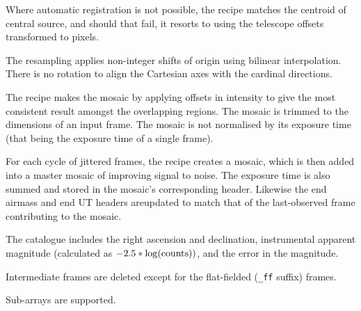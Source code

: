 \documentclass[twoside,11pt,nolof]{starlink}
\begin{document}
{{{         \sstitem
         Where automatic registration is not possible, the recipe matches
         the centroid of central source, and should that fail, it resorts
         to using the telescope offsets transformed to pixels.

         \sstitem
         The resampling applies non-integer shifts of origin using
         bilinear interpolation.  There is no rotation to align the
         Cartesian axes with the cardinal directions.

         \sstitem
         The recipe makes the mosaic by applying offsets in intensity to
         give the most consistent result amongst the overlapping regions.
         The mosaic is trimmed to the dimensions of an input frame.  The
         mosaic is not normalised by its exposure time (that being the
         exposure time of a single frame).

         \sstitem
         For each cycle of jittered frames, the recipe creates a mosaic,
         which is then added into a master mosaic of improving signal to
         noise.  The exposure time is also summed and stored in the mosaic's
         corresponding header.  Likewise the end airmass and end UT headers
         areupdated to match that of the last-observed frame contributing
         to the mosaic.

         \sstitem
         The catalogue includes the right ascension and declination,
         instrumental apparent magnitude (calculated as
         $-2.5 * \log( {\rm{counts}} ))$, and the error in the magnitude.

         \sstitem
         Intermediate frames are deleted except for the flat-fielded ({\tt\_ff}
         suffix) frames.

         \sstitem
         Sub-arrays are supported.
      }
   }
   }
\end{document}
